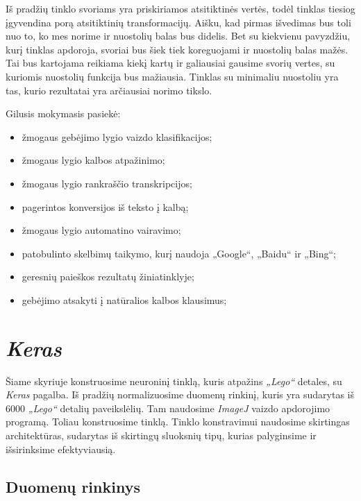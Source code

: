 \documentclass{VUMIFInfKursinis}
\begin{document}
Iš pradžių tinklo svoriams yra priskiriamos atsitiktinės vertės, todėl tinklas tiesiog įgyvendina porą atsitiktinių transformacijų. Aišku, kad pirmas išvedimas bus toli nuo to, ko mes norime ir nuostolių balas bus didelis. Bet su kiekvienu pavyzdžiu, kurį tinklas apdoroja, svoriai bus šiek tiek koreguojami ir nuostolių balas mažės. Tai bus kartojama reikiama kiekį kartų ir galiausiai gausime svorių vertes, su kuriomis nuostolių funkcija bus mažiausia. Tinklas su minimaliu nuostoliu yra tas, kurio rezultatai yra arčiausiai norimo tikslo. \cite{1}

\vspace{10mm}

Gilusis mokymasis pasiekė:
\begin{itemize}
  \item žmogaus gebėjimo lygio vaizdo klasifikacijos;
  \item žmogaus lygio kalbos atpažinimo;
  \item žmogaus lygio rankraščio transkripcijos;
  \item pagerintos konversijos iš teksto į kalbą;
  \item žmogaus lygio automatino vairavimo;
  \item patobulinto skelbimų taikymo, kurį naudoja „Google“, „Baidu“ ir „Bing“;
  \item geresnių paieškos rezultatų žiniatinklyje;
  \item gebėjimo atsakyti į natūralios kalbos klausimus;
\end{itemize}


\newpage

\section{\textit{Keras}}
\vspace{10mm}

Šiame skyriuje konstruosime neuroninį tinklą, kuris atpažins \textit{„Lego“} detales, su \textit{Keras} pagalba. Iš pradžių normalizuosime duomenų rinkinį, kuris yra sudarytas iš 6000 \textit{„Lego“} detalių paveikslėlių. Tam naudosime \textit{ImageJ} vaizdo apdorojimo programą. Toliau konstruosime tinklą. Tinklo konstravimui naudosime skirtingas architektūras, sudarytas iš skirtingų sluoksnių tipų, kurias palyginsime ir išsirinksime efektyviausią.

\subsection{Duomenų rinkinys}
\end{document}
